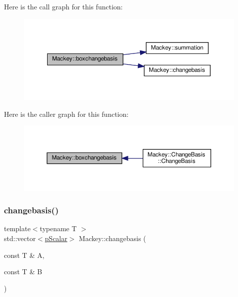 Here is the call graph for this function\+:\nopagebreak
\begin{figure}[H]
\begin{center}
\leavevmode
\includegraphics[width=350pt]{namespaceMackey_a90ea60504ffb74da3a53875368225f8f_cgraph}
\end{center}
\end{figure}
Here is the caller graph for this function\+:\nopagebreak
\begin{figure}[H]
\begin{center}
\leavevmode
\includegraphics[width=350pt]{namespaceMackey_a90ea60504ffb74da3a53875368225f8f_icgraph}
\end{center}
\end{figure}
\mbox{\label{namespaceMackey_a92891f5582872405be46b80b5fa1fb84}} 
\subsubsection{\texorpdfstring{changebasis()}{changebasis()}}
{\footnotesize\ttfamily template$<$typename T $>$ \\
std\+::vector$<$\hyperlink{namespaceMackey_a67b5f4650ba2f166d15133a1bea2472b}{p\+Scalar}$>$ Mackey\+::changebasis (\begin{DoxyParamCaption}\item[{const T \&}]{A,  }\item[{const T \&}]{B }\end{DoxyParamCaption})}



